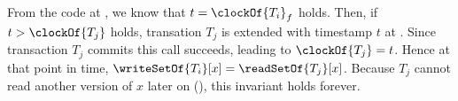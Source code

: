 







    From the code at , we know that $t=\clockOf{T_i}_f$ holds.
    Then, if $t > \clockOf{T_j}$ holds, transation $T_j$ is extended with timestamp $t$ at .
    Since transaction $T_j$ commits this call succeeds, leading to $\clockOf{T_j} = t$.
    Hence at that point in time, $\writeSetOf{T_i}[x] = \readSetOf{T_j}[x]$.
    Because $T_j$ cannot read another version of $x$ later on (), this invariant holds forever.
